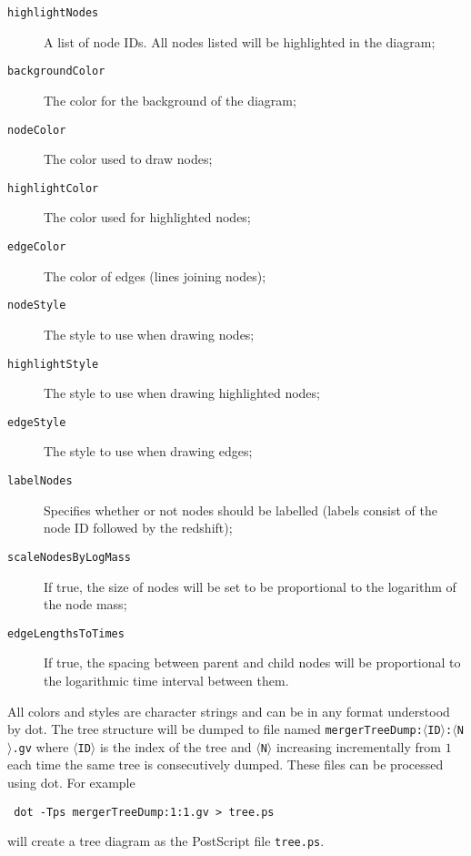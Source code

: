 \begin{description}
 \item [{\tt highlightNodes}] A list of node IDs. All nodes listed will be highlighted in the diagram;
 \item [{\tt backgroundColor}] The color for the background of the diagram;
 \item [{\tt nodeColor}] The color used to draw nodes;
 \item [{\tt highlightColor}] The color used for highlighted nodes;
 \item [{\tt edgeColor}] The color of edges (lines joining nodes);
 \item [{\tt nodeStyle}] The style to use when drawing nodes;
 \item [{\tt highlightStyle}] The style to use when drawing highlighted nodes;
 \item [{\tt edgeStyle}] The style to use when drawing edges;
 \item [{\tt labelNodes}] Specifies whether or not nodes should be labelled (labels consist of the node ID followed by the redshift);
 \item [{\tt scaleNodesByLogMass}] If true, the size of nodes will be set to be proportional to the logarithm of the node mass;
 \item [{\tt edgeLengthsToTimes}] If true, the spacing between parent and child nodes will be proportional to the logarithmic time interval between them.
\end{description}
All colors and styles are character strings and can be in any format understood by {\sc dot}. The tree structure will be dumped to file named {\tt mergerTreeDump:$\langle$ID$\rangle$:$\langle$N$\rangle$.gv} where {\tt $\langle$ID$\rangle$} is the index of the tree and {\tt $\langle$N$\rangle$} increasing incrementally from $1$ each time the same tree is consecutively dumped. These files can be processed using {\sc dot}. For example
\begin{verbatim}
 dot -Tps mergerTreeDump:1:1.gv > tree.ps
\end{verbatim}
will create a tree diagram as the PostScript file {\tt tree.ps}.
